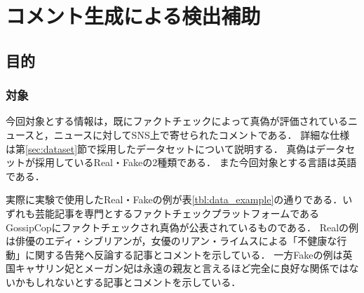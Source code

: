 \chapter{コメント生成による検出補助}\label{ch:gen_com}
\section{目的}\label{sec:gen_pur}
\label{ch:purpose}
\subsection{対象}
今回対象とする情報は，既にファクトチェックによって真偽が評価されているニュースと，ニュースに対してSNS上で寄せられたコメントである．
詳細な仕様は第\ref{sec:dataset}節で採用したデータセットについて説明する．
真偽はデータセットが採用しているReal・Fakeの2種類である．
また今回対象とする言語は英語である．

実際に実験で使用したReal・Fakeの例が表\ref{tbl:data_example}の通りである．いずれも芸能記事を専門とするファクトチェックプラットフォームであるGossipCopにファクトチェックされ真偽が公表されているものである．
Realの例は俳優のエディ・シブリアンが，女優のリアン・ライムスによる「不健康な行動」に関する告発へ反論する記事\cite{calvario_2017}とコメントを示している．
一方Fakeの例は英国キャサリン妃とメーガン妃は永遠の親友と言えるほど完全に良好な関係ではないかもしれないとする記事\cite{bahou_2018}とコメントを示している．

